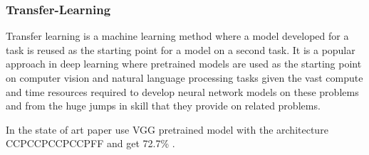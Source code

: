 \subsubsection{Transfer-Learning}
\label{sec:transferlearning}
Transfer learning is a machine learning method where a model developed for a task is reused as the starting point for a model on a second task.
It is a popular approach in deep learning where pretrained models are used as the starting point on computer vision and natural language processing tasks given the vast compute and time resources required to develop neural network models on these problems and from the huge jumps in skill that they provide on related problems.

In the state of art paper use VGG pretrained model with the architecture CCPCCPCCPCCPFF and get 72.7\% .

